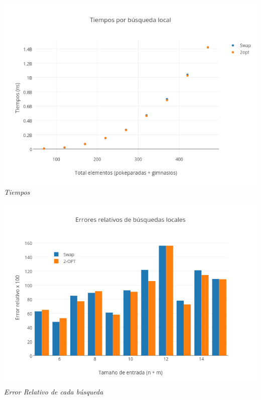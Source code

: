    \vspace*{0.3cm} \vspace*{0.3cm}
  \begin{center}
	\includegraphics[scale=0.50]{./EJ3/tiemposLocales470cuad.png}
	\label{fig:gruposTiempos2}	
	\\{\textit{Tiempos}}
  \end{center}
  \vspace*{0.3cm} 
 

   \vspace*{0.3cm} \vspace*{0.3cm}
  \begin{center}
	\includegraphics[scale=0.50]{./EJ3/familiaError.png}
	\label{fig:gruposError}	
	\\{\textit{Error Relativo de cada búsqueda}}
  \end{center}
  \vspace*{0.3cm} 
  
